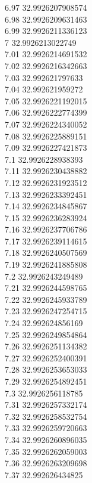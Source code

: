 {6.97	32.9926207908574\\
6.98	32.9926209631463\\
6.99	32.9926211336123\\
7	32.9926213022749\\
7.01	32.9926214691532\\
7.02	32.9926216342663\\
7.03	32.992621797633\\
7.04	32.992621959272\\
7.05	32.9926221192015\\
7.06	32.9926222774399\\
7.07	32.9926224340052\\
7.08	32.9926225889151\\
7.09	32.9926227421873\\
7.1	32.9926228938393\\
7.11	32.9926230438882\\
7.12	32.9926231923512\\
7.13	32.9926233392451\\
7.14	32.9926234845867\\
7.15	32.9926236283924\\
7.16	32.9926237706786\\
7.17	32.9926239114615\\
7.18	32.9926240507569\\
7.19	32.9926241885808\\
7.2	32.9926243249489\\
7.21	32.9926244598765\\
7.22	32.9926245933789\\
7.23	32.9926247254715\\
7.24	32.992624856169\\
7.25	32.9926249854864\\
7.26	32.9926251134382\\
7.27	32.9926252400391\\
7.28	32.9926253653033\\
7.29	32.9926254892451\\
7.3	32.9926256118785\\
7.31	32.9926257332174\\
7.32	32.9926258532754\\
7.33	32.9926259720663\\
7.34	32.9926260896035\\
7.35	32.9926262059003\\
7.36	32.9926263209698\\
7.37	32.992626434825\\
}
